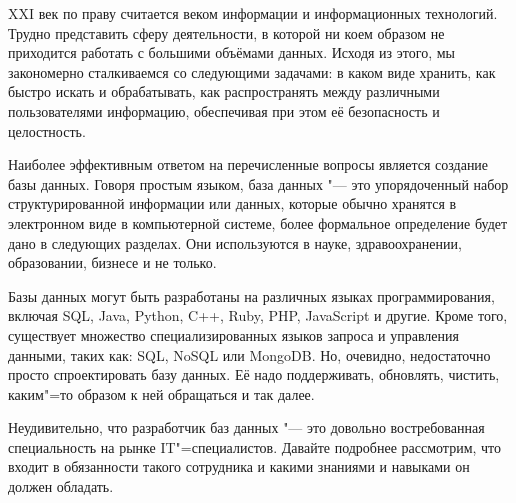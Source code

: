 XXI век по праву считается веком информации и информационных технологий. Трудно
представить сферу деятельности, в которой ни коем образом не приходится работать с
большими объёмами данных. Исходя из этого, мы закономерно сталкиваемся со
следующими задачами: в каком виде хранить, как быстро искать и обрабатывать, как
распространять между различными пользователями информацию, обеспечивая при этом
её безопасность и целостность.

Наиболее эффективным ответом на перечисленные вопросы является создание базы
данных. Говоря простым языком, база данных "--- это упорядоченный набор
структурированной информации или данных, которые обычно хранятся в электронном
виде в компьютерной системе, более формальное определение будет дано в следующих
разделах. Они используются в науке, здравоохранении, образовании,
бизнесе и не только.

Базы данных могут быть разработаны на различных языках программирования,
включая SQL, Java, Python, C++, Ruby, PHP, JavaScript и другие. Кроме того, 
существует множество специализированных языков запроса и управления данными,
таких как: SQL, NoSQL или MongoDB. Но, очевидно, недостаточно просто
спроектировать базу данных. Её надо поддерживать, обновлять, чистить, каким"=то
образом к ней обращаться и так далее.

Неудивительно, что разработчик баз данных "--- это довольно востребованная
специальность на рынке IT"=специалистов. Давайте подробнее рассмотрим, что
входит в обязанности такого сотрудника и какими знаниями и навыками он должен
обладать.